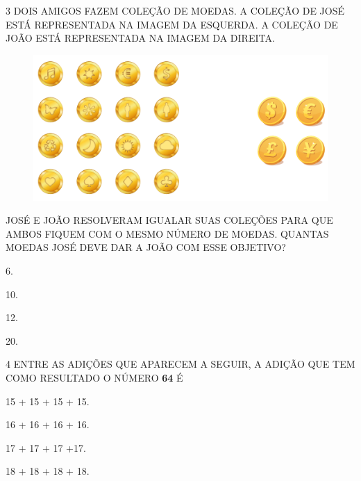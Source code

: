\num{3} DOIS AMIGOS FAZEM COLEÇÃO DE MOEDAS. A COLEÇÃO DE JOSÉ ESTÁ REPRESENTADA NA IMAGEM DA
ESQUERDA. A COLEÇÃO DE JOÃO ESTÁ REPRESENTADA NA IMAGEM DA DIREITA.


\begin{figure}[H]
\includegraphics[width=\textwidth]{./media/SAEB_1ANO_MAT_FIGURA121.png}
\end{figure}

JOSÉ E JOÃO RESOLVERAM IGUALAR SUAS COLEÇÕES PARA QUE AMBOS FIQUEM COM O MESMO NÚMERO DE MOEDAS. QUANTAS MOEDAS JOSÉ DEVE DAR A JOÃO COM ESSE OBJETIVO?

\begin{escolha}%
\item 6.

\item 10.

\item 12.

\item 20.
\end{escolha}

\num{4} ENTRE AS ADIÇÕES QUE APARECEM A SEGUIR, A ADIÇÃO QUE 
TEM COMO RESULTADO O NÚMERO \textbf{64} É

\begin{escolha}[itemsep=0pt]
\item 15 + 15 + 15 + 15.

\item 16 + 16 + 16 + 16.

\item 17 + 17 + 17 +17.

\item 18 + 18 + 18 + 18.
\end{escolha}

